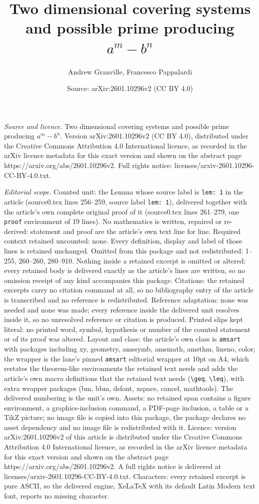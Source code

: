 \documentclass[10pt,a4paper]{amsart}
\title[Two dimensional covering systems and possible prime producin]{Two dimensional covering systems and possible prime producing $a^m-b^n$}
\author{Andrew Granville, Francesco Pappalardi}
\date{Source: arXiv:2601.10296v2 (CC BY 4.0)}
\begin{document}
\maketitle

\noindent\emph{Source and licence.} Two dimensional covering systems and possible prime producing $a^m-b^n$. Version arXiv:2601.10296v2 (CC BY 4.0), distributed under the Creative Commons Attribution 4.0 International licence, as recorded in the arXiv licence metadata for this exact version and shown on the abstract page https://arxiv.org/abs/2601.10296v2. Full rights notice: licenses/arxiv-2601.10296-CC-BY-4.0.txt.\par\smallskip

\noindent\textit{Editorial scope.} Counted unit: the Lemma whose source label is \texttt{lem: 1} in the article (source0.tex lines 256--259, source label \texttt{lem: 1}), delivered together with the article's own complete original proof of it (source0.tex lines 261--279, one \texttt{proof} environment of 19 lines). No mathematics is written, repaired or re-derived: statement and proof are the article's own text line for line. Required context retained uncounted: none. Every definition, display and label of those lines is retained unchanged. Omitted from this package and not redistributed: 1--255, 260--260, 280--910. Nothing inside a retained excerpt is omitted or altered: every retained body is delivered exactly as the article's lines are written, so no omission receipt of any kind accompanies this package. Citations: the retained excerpts carry no citation command at all, so no bibliography entry of the article is transcribed and no reference is redistributed. Reference adaptation: none was needed and none was made; every reference inside the delivered unit resolves inside it, so no unresolved reference or citation is produced. Printed slips kept literal: no printed word, symbol, hypothesis or number of the counted statement or of its proof was altered. Layout and class: the article's own class is \texttt{amsart} with packages including xy, geometry, amssymb, amsmath, amsthm, lineno, color; the wrapper is the lane's pinned \texttt{amsart} editorial wrapper at 10pt on A4, which restates the theorem-like environments the retained text needs and adds the article's own macro definitions that the retained text needs (\texttt{\textbackslash geq}, \texttt{\textbackslash leq}), with extra wrapper packages (bm, bbm, dsfont, xspace, cancel, mathtools). The delivered numbering is the unit's own. Assets: no retained span contains a figure environment, a graphics-inclusion command, a PDF-page inclusion, a table or a TikZ picture; no image file is copied into this package, the package declares no asset dependency and no image file is redistributed with it. Licence: version arXiv:2601.10296v2 of this article is distributed under the Creative Commons Attribution 4.0 International licence, as recorded in the arXiv licence metadata for this exact version and shown on the abstract page https://arxiv.org/abs/2601.10296v2. A full rights notice is delivered at licenses/arxiv-2601.10296-CC-BY-4.0.txt. Characters: every retained excerpt is pure ASCII, so the delivered engine, XeLaTeX with its default Latin Modern text font, reports no missing character.
\end{document}
